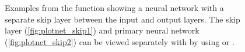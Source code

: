 \documentclass[article]{jss}
\begin{document}
\begin{figure}[t!]
\caption{Examples from the  function showing a neural network with a separate skip layer between the input and output layers.  The skip layer (\ref{fig:plotnet_skip1}) and primary neural network (\ref{fig:plotnet_skip2}) can be viewed separately with  by using  or .}
\label{fig:plotnet_skip}
\end{figure}
\end{document}
